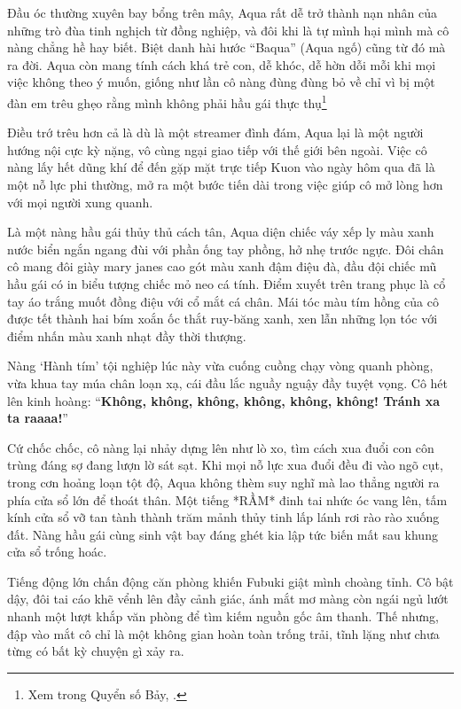 \documentclass[../main.tex]{subfiles}
\begin{document}
Đầu óc thường xuyên bay bổng trên mây, Aqua rất dễ trở thành nạn nhân của những trò đùa tinh nghịch từ đồng nghiệp, và đôi khi là tự mình hại mình mà cô nàng chẳng hề hay biết. Biệt danh hài hước ``Baqua'' (Aqua ngố) cũng từ đó mà ra đời. Aqua còn mang tính cách khá trẻ con, dễ khóc, dễ hờn dỗi mỗi khi mọi việc không theo ý muốn, giống như lần cô nàng đùng đùng bỏ về chỉ vì bị một đàn em trêu ghẹo rằng mình không phải hầu gái thực thụ\footnote{Xem trong Quyển số Bảy, .}

Điều trớ trêu hơn cả là dù là một streamer đình đám, Aqua lại là một người hướng nội cực kỳ nặng, vô cùng ngại giao tiếp với thế giới bên ngoài. Việc cô nàng lấy hết dũng khí để đến gặp mặt trực tiếp Kuon vào ngày hôm qua đã là một nỗ lực phi thường, mở ra một bước tiến dài trong việc giúp cô mở lòng hơn với mọi người xung quanh.

Là một nàng hầu gái thủy thủ cách tân, Aqua diện chiếc váy xếp ly màu xanh nước biển ngắn ngang đùi với phần ống tay phồng, hở nhẹ trước ngực. Đôi chân cô mang đôi giày mary janes cao gót màu xanh đậm điệu đà, đầu đội chiếc mũ hầu gái có in biểu tượng chiếc mỏ neo cá tính. Điểm xuyết trên trang phục là cổ tay áo trắng muốt đồng điệu với cổ mắt cá chân. Mái tóc màu tím hồng của cô được tết thành hai bím xoắn ốc thắt ruy-băng xanh, xen lẫn những lọn tóc với điểm nhấn màu xanh nhạt đầy thời thượng.

\chrint


Nàng `Hành tím' tội nghiệp lúc này vừa cuống cuồng chạy vòng quanh phòng, vừa khua tay múa chân loạn xạ, cái đầu lắc nguầy nguậy đầy tuyệt vọng. Cô hét lên kinh hoàng: ``\textbf{Không, không, không, không, không, không! Tránh xa ta raaaa!}''

Cứ chốc chốc, cô nàng lại nhảy dựng lên như lò xo, tìm cách xua đuổi con côn trùng đáng sợ đang lượn lờ sát sạt. Khi mọi nỗ lực xua đuổi đều đi vào ngõ cụt, trong cơn hoảng loạn tột độ, Aqua không thèm suy nghĩ mà lao thẳng người ra phía cửa sổ lớn để thoát thân. Một tiếng *RẦM* đinh tai nhức óc vang lên, tấm kính cửa sổ vỡ tan tành thành trăm mảnh thủy tinh lấp lánh rơi rào rào xuống đất. Nàng hầu gái cùng sinh vật bay đáng ghét kia lập tức biến mất sau khung cửa sổ trống hoác.

Tiếng động lớn chấn động căn phòng khiến Fubuki giật mình choàng tỉnh. Cô bật dậy, đôi tai cáo khẽ vểnh lên đầy cảnh giác, ánh mắt mơ màng còn ngái ngủ lướt nhanh một lượt khắp văn phòng để tìm kiếm nguồn gốc âm thanh. Thế nhưng, đập vào mắt cô chỉ là một không gian hoàn toàn trống trải, tĩnh lặng như chưa từng có bất kỳ chuyện gì xảy ra.
\end{document}
